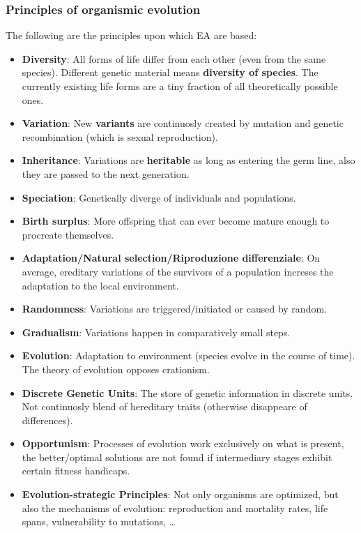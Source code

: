 \documentclass{article}
\begin{document}
\subsubsection{Principles of organismic evolution}
The following are the principles upon which EA are based:
\begin{itemize}
    \item \textbf{Diversity}: All forms of life differ from each other (even from the same species). Different genetic material
          means \textbf{diversity of species}. The currently existing life forms are a tiny fraction of
          all theoretically possible ones.
    \item \textbf{Variation}: New \textbf{variants} are continuosly created by mutation and genetic recombination (which is sexual reproduction).
    \item \textbf{Inheritance}: Variations are \textbf{heritable} as long as entering the germ line, also they are passed to the next
          generation.
    \item \textbf{Speciation}: Genetically diverge of individuals and populations.
    \item \textbf{Birth surplus}: More offspring that can ever become mature enough to procreate
          themselves.
    \item \textbf{Adaptation/Natural selection/Riproduzione differenziale}: On average, ereditary
          variations of the survivors of a population increses the adaptation to the local environment.
    \item \textbf{Randomness}: Variations are triggered/initiated or caused by random.
    \item \textbf{Gradualism}: Variations happen in comparatively small steps.
    \item \textbf{Evolution}: Adaptation to environment (species evolve in the course of time). The
          theory of evolution opposes crationism.
    \item \textbf{Discrete Genetic Units}: The store of genetic information in discrete units. Not
          continuosly blend of hereditary traits (otherwise disappeare of differences).
    \item \textbf{Opportunism}: Processes of evolution work exclusively on what is present, the
          better/optimal solutions are not found if intermediary stages exhibit certain fitness handicaps.
    \item \textbf{Evolution-strategic Principles}: Not only organisms are optimized, but also the
          mechanisms of evolution: reproduction and mortality rates, life spans, vulnerability to mutations, \dots

\end{itemize}
\end{document}
